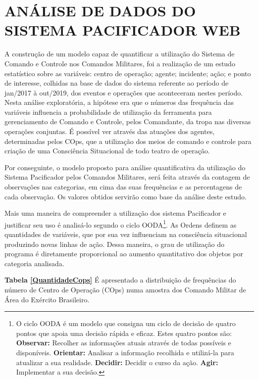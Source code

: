 \chapter{ANÁLISE DE DADOS DO SISTEMA PACIFICADOR WEB}
A construção de um modelo capaz de quantificar a utilização do Sistema de Comando e Controle nos Comandos Militares, foi a realização de um estudo estatístico sobre as variáveis: centro de operação; agente; incidente; ação; e ponto de interesse, colhidas na base de dados do sistema referente ao período de jan/2017 à out/2019, dos eventos e operações que aconteceram nestes período. Nesta análise exploratória, a hipótese era que o números das frequência das variáveis influencia a probabilidade de utilização da ferramenta para gerenciamento de Comando e Controle, pelos Comandante, da tropa nas diversas operações conjuntas. É possível ver através das atuações dos agentes, determinadas pelos COps, que a utilização dos meios de comando e controle para criação de uma Consciência Situacional de todo teatro de operação. 

Por conseguinte, o modelo proposto para análise quantificativa da utilização do Sistema Pacificador pelos Comandos Militares, será feita através da contagem de observações nas categorias, em cima das suas frequências e as percentagens de cada observação. Os valores obtidos servirão como base da análise deste estudo. 


Mais uma maneira de compreender a utilização dos sistema Pacificador e justificar seu uso é analisá-lo segundo o ciclo OODA\footnote{O ciclo OODA é um modelo que consigna um ciclo de decisão de quatro pontos que apoia uma decisão rápida e eficaz. Estes quatro pontos são: \textbf{Observar: }Recolher as informações atuais através de todas possíveis e disponíveis. \textbf{Orientar: }Analisar a informação recolhida e utilizá-la para atualizar a sua realidade. \textbf{Decidir: }Decidir o curso da ação. \textbf{Agir: }Implementar a sua decisão.}. As Ordens definem as quantidades de variáveis, que por sua vez influenciam na consciência situacional produzindo novas linhas de ação. Dessa maneira, o grau de utilização do programa é diretamente proporcional ao aumento quantitativo dos objetos por categoria analisada.

\textbf{Tabela \ref{QuantidadeCops}} É apresentado a distribuição de frequências do número de Centro de Operação (COps) numa amostra dos Comando Militar de Área do Exército Brasileiro. 

